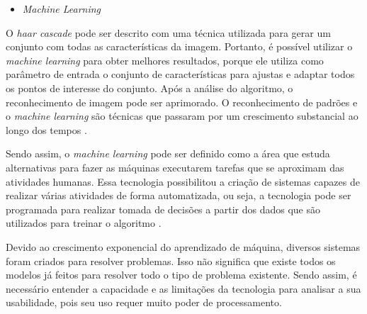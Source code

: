 \begin{itemize}
\raggedright \item \label{itm:machinelearning} \textit{Machine Learning}
\end{itemize}

O \textit{haar cascade} pode ser descrito com uma técnica utilizada para gerar um conjunto com todas as características da imagem.  Portanto, é possível utilizar o \textit{machine learning} para obter melhores resultados, porque ele utiliza como parâmetro de entrada o conjunto de características para ajustas e adaptar todos os pontos de interesse do conjunto.  Após a análise do algoritmo, o reconhecimento de imagem pode ser aprimorado. O reconhecimento de padrões e o \textit{machine learning} são técnicas que passaram por um crescimento substancial ao longo dos tempos \cite{BISHOP2006}.
 
Sendo assim, o \textit{machine learning} pode ser definido como a área que estuda alternativas para fazer as máquinas executarem tarefas que se aproximam das atividades humanas. Essa tecnologia possibilitou a criação de sistemas capazes de realizar várias atividades de forma automatizada, ou seja, a tecnologia pode ser programada para realizar tomada de decisões a partir dos dados que são utilizados para treinar o algoritmo \cite{MONARD2003}.

Devido ao crescimento exponencial do aprendizado de máquina, diversos sistemas foram criados para resolver problemas. Isso não significa que existe todos os modelos já feitos para resolver todo o tipo de problema existente. Sendo assim, é necessário entender a capacidade e as limitações da tecnologia para analisar a sua usabilidade, pois seu uso requer muito poder de processamento.